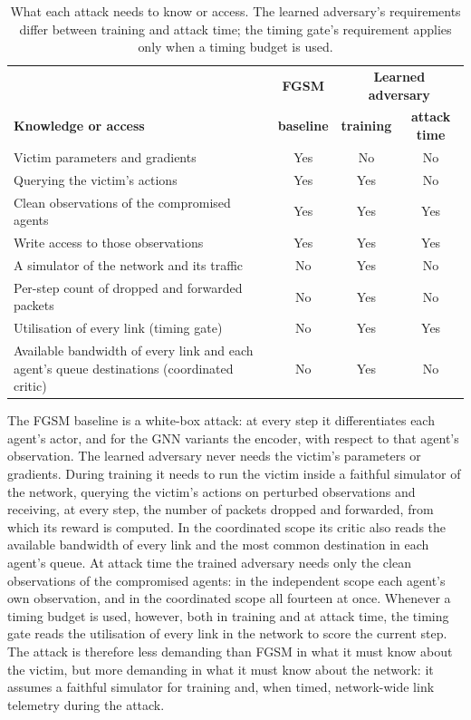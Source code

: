 \begin{table}[htbp]
  \centering
  \small
  \caption{What each attack needs to know or access. The learned adversary's
           requirements differ between training and attack time; the timing gate's
           requirement applies only when a timing budget is used.}
  \label{tab:threat_knowledge}
  \begin{tabular}{p{6.4cm}ccc}
    \hline
    & \textbf{FGSM} & \multicolumn{2}{c}{\textbf{Learned adversary}} \\
    \textbf{Knowledge or access} & \textbf{baseline} & \textbf{training} & \textbf{attack time} \\
    \hline
    Victim parameters and gradients                         & Yes & No  & No  \\
    Querying the victim's actions                           & Yes & Yes & No  \\
    Clean observations of the compromised agents            & Yes & Yes & Yes \\
    Write access to those observations                      & Yes & Yes & Yes \\
    A simulator of the network and its traffic              & No  & Yes & No  \\
    Per-step count of dropped and forwarded packets         & No  & Yes & No  \\
    Utilisation of every link (timing gate)                 & No  & Yes & Yes \\
    Available bandwidth of every link and each agent's
    queue destinations (coordinated critic)                 & No  & Yes & No  \\
    \hline
  \end{tabular}
\end{table}

The FGSM baseline is a white-box attack: at every step it differentiates each agent's
actor, and for the GNN variants the encoder, with respect to that agent's observation.
The learned adversary never needs the victim's parameters or gradients. During training
it needs to run the victim inside a faithful simulator of the network, querying the
victim's actions on perturbed observations and receiving, at every step, the number of
packets dropped and forwarded, from which its reward is computed. In the coordinated
scope its critic also reads the available bandwidth of every link and the most common
destination in each agent's queue. At attack time the trained adversary needs only the
clean observations of the compromised agents: in the independent scope each agent's own
observation, and in the coordinated scope all fourteen at once. Whenever a timing budget
is used, however, both in training and at attack time, the timing gate reads the
utilisation of every link in the network to score the current step. The attack is
therefore less demanding than FGSM in what it must know about the victim, but more
demanding in what it must know about the network: it assumes a faithful simulator for
training and, when timed, network-wide link telemetry during the attack.

